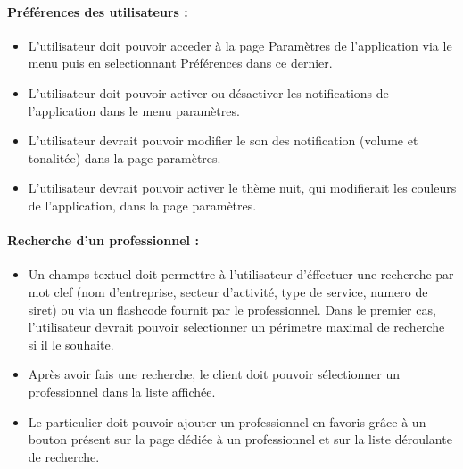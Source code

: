 \documentclass{article}
\begin{document}
\paragraph{Préférences des utilisateurs :}
\begin{itemize}
\item L'utilisateur doit pouvoir acceder à la page \og Paramètres \fg{} de l'application via le menu
 puis en selectionnant \og Préférences \fg{}
  dans ce dernier.
\item L'utilisateur doit pouvoir activer ou désactiver les notifications
  de l'application dans le menu paramètres.
\item L'utilisateur devrait pouvoir modifier le son des notification
  (volume et tonalitée) dans la page paramètres.
\item L'utilisateur devrait pouvoir activer le thème nuit, qui modifierait les
  couleurs de l'application, dans la page paramètres.
\end{itemize}
\paragraph{Recherche d'un professionnel :}
\begin{itemize}
\item Un champs textuel doit permettre à l'utilisateur d'éffectuer une
  recherche par mot clef (nom d'entreprise, secteur d'activité, type de service, numero de siret) ou via un flashcode fournit par le professionnel. Dans
  le premier cas, l'utilisateur devrait pouvoir selectionner
  un périmetre maximal de recherche si il le souhaite.
\item Après avoir fais une recherche, le client doit pouvoir sélectionner un
  professionnel dans la liste affichée.
\item Le particulier doit pouvoir ajouter un professionnel en favoris grâce
  à un bouton présent sur la page dédiée à un professionnel et sur la
  liste déroulante de recherche.


\end{itemize}
\end{document}
